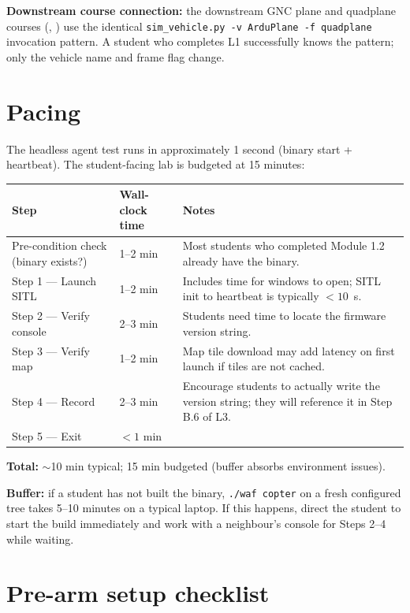 \documentclass[a4paper,11pt,twoside]{article}
\begin{document}
\textbf{Downstream course connection:} the downstream GNC plane and quadplane courses (\siblingplane, \siblingquadplane) use the identical \texttt{sim\_vehicle.py -v ArduPlane -f quadplane} invocation pattern. A student who completes L1 successfully knows the pattern; only the vehicle name and frame flag change.

\section*{Pacing}

The headless agent test runs in approximately 1 second (binary start + heartbeat). The student-facing lab is budgeted at 15 minutes:

\begin{center}\small
\begin{tabular}{|p{5.0cm}|p{3.2cm}|p{6.5cm}|}\hline
\textbf{Step} & \textbf{Wall-clock time} & \textbf{Notes} \\ \hline
Pre-condition check (binary exists?) & 1--2 min & Most students who completed Module 1.2 already have the binary. \\ \hline
Step 1 --- Launch SITL & 1--2 min & Includes time for windows to open; SITL init to heartbeat is typically $<10$~s. \\ \hline
Step 2 --- Verify console & 2--3 min & Students need time to locate the firmware version string. \\ \hline
Step 3 --- Verify map & 1--2 min & Map tile download may add latency on first launch if tiles are not cached. \\ \hline
Step 4 --- Record & 2--3 min & Encourage students to actually write the version string; they will reference it in Step B.6 of L3. \\ \hline
Step 5 --- Exit & $<1$ min & \\ \hline
\end{tabular}
\end{center}

\textbf{Total:} $\sim$10 min typical; 15 min budgeted (buffer absorbs environment issues).

\textbf{Buffer:} if a student has not built the binary, \texttt{./waf copter} on a fresh configured tree takes 5--10 minutes on a typical laptop. If this happens, direct the student to start the build immediately and work with a neighbour's console for Steps 2--4 while waiting.

\section*{Pre-arm setup checklist}
\end{document}

